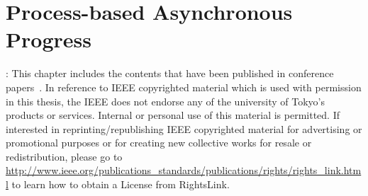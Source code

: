 \chapter{Process-based Asynchronous Progress}\label{sec:casper}

: This chapter includes the contents that have been published in
conference papers~\cite{casper}\cite{casper-scaling}. In
reference to IEEE copyrighted material which is used with permission
in this thesis, the IEEE does not endorse any of the university of Tokyo's
products or services. Internal or personal use of this material is permitted.
If interested in reprinting/republishing IEEE copyrighted material for
advertising or promotional purposes or for creating new collective works
for resale or redistribution, please go to
\url{http://www.ieee.org/publications_standards/publications/rights/rights_link.html}
to learn how to obtain a License from RightsLink.






